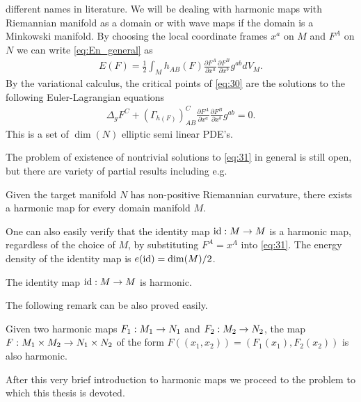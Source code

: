 different names in literature. We will be dealing with harmonic maps
with Riemannian manifold as a domain or with wave maps if the domain
is a Minkowski manifold. By choosing the local coordinate frames $x^a$
on $M$ and $F^A$ on $N$ we can write \eqref{eq:En_general} as
\begin{align}
  \label{eq:30}
  E(F)=\frac{1}{2}\int_M h_{AB}(F)\frac{\partial F^A}{\partial
    x^a}\frac{\partial F^B}{\partial x^b}g^{ab}dV_M.
\end{align}
By the variational calculus, the critical points of \eqref{eq:30} are
the solutions to the following Euler-Lagrangian equations
\begin{align}
  \label{eq:31}
  \Delta_g F^C+(\Gamma_{h(F)})_{AB}^{C}\frac{\partial F^A}{\partial
    x^a}\frac{\partial F^B}{\partial x^b}g^{ab}=0.
\end{align}
This is a set of $\dim(N)$ elliptic semi linear PDE's.

The problem of existence of nontrivial solutions to \eqref{eq:31} in
general is still open, but there are variety of partial results
including e.g.

\begin{theorem}
  Given the target manifold $N$ has non-positive Riemannian curvature,
  there exists a harmonic map for every domain manifold $M$.
\end{theorem}

One can also easily verify that the identity map $\text{id}:M\rightarrow M$ is a
harmonic map, regardless of the choice of $M$, by substituting
$F^A=x^A$ into \eqref{eq:31}. The energy density of the identity map
is $e(\text{id})=\dim(M)/2$.\\

\begin{remark}\label{rem:1}
  The identity map $\text{id}:M\rightarrow M$ is harmonic.
\end{remark}

The following remark can be also proved easily.

\begin{remark}\label{rem:2}
  Given two harmonic maps $F_1:M_1\rightarrow N_1$ and $F_2:M_2\rightarrow N_2$, the
  map $F:M_1\times M_2\rightarrow N_1\times N_2$ of the form
  $F((x_1,x_2))=(F_1(x_1),F_2(x_2))$ is also harmonic.
\end{remark}

After this very brief introduction to harmonic maps we proceed to the
problem to which this thesis is devoted.


